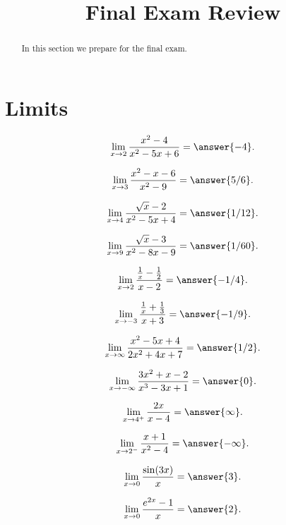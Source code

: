 \documentclass[handout]{ximera}
\title{Final Exam Review}
\begin{document}
\begin{abstract}
In this section we prepare for the final exam.
\end{abstract}

\maketitle



\section{Limits}


\begin{problem}
\[\lim_{x \to 2} \frac{x^2 - 4}{x^2 - 5x + 6} = \answer{-4}.\]

\[\lim_{x \to 3} \frac{x^2 -x -6}{x^2 - 9} = \answer{5/6}.\]
\end{problem}


\begin{problem}
\[\lim_{x \to 4} \frac{\sqrt x - 2}{x^2 - 5x + 4} = \answer{1/12}.\]

\[\lim_{x \to 9} \frac{\sqrt x - 3}{x^2 - 8x - 9} = \answer{1/60}.\]
\end{problem}

\begin{problem}
\[\lim_{x \to 2} \frac{\frac{1}{x} - \frac12 }{x- 2} = \answer{-1/4}.\]

\[\lim_{x \to {-3}} \frac{\frac{1}{x} + \frac13 }{x+ 3} = \answer{-1/9}.\]
\end{problem}

\begin{problem}
\[\lim_{x \to \infty} \frac{x^2 - 5x + 4}{2x^2 + 4x + 7} = \answer{1/2}.\]

\[\lim_{x \to -\infty} \frac{3x^2 + x - 2}{x^3 -3x + 1} = \answer{0}.\]
\end{problem}

\begin{problem}
\[\lim_{x \to 4^+} \frac{2x}{x-4} = \answer{\infty}.\]

\[\lim_{x \to 2^-} \frac{x+1}{x^2 - 4} = \answer{-\infty}.\]
\end{problem}



\begin{problem}
\[\lim_{x \to 0} \frac{\sin(3x)}{x} = \answer{3}.\]

\[\lim_{x \to 0} \frac{e^{2x} -1}{x} = \answer{2}.\]
\end{problem}
\end{document}
